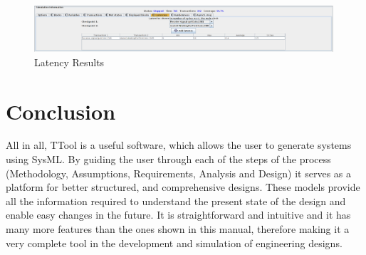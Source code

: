 \documentclass[12pt]{article}
\begin{document}
\begin{figure}[htbp]
\centering
\includegraphics[width=0.99\textwidth]{fig/latencyresults.png}
\caption{Latency Results} \label{fig:latencyresults}
\end{figure}


\section{Conclusion}

	All in all, TTool is a useful software, which allows the user to generate systems using SysML. By guiding the user through each of the steps of the process (Methodology, Assumptions, Requirements, Analysis and Design) it serves as a platform for better structured, and comprehensive designs. These models provide all the information required to understand the present state of the design and enable easy changes in the future. It is straightforward and intuitive and it has many more features than the ones shown in this manual, therefore making it a very complete tool in the development and simulation of engineering designs. 
	
\end{document}
